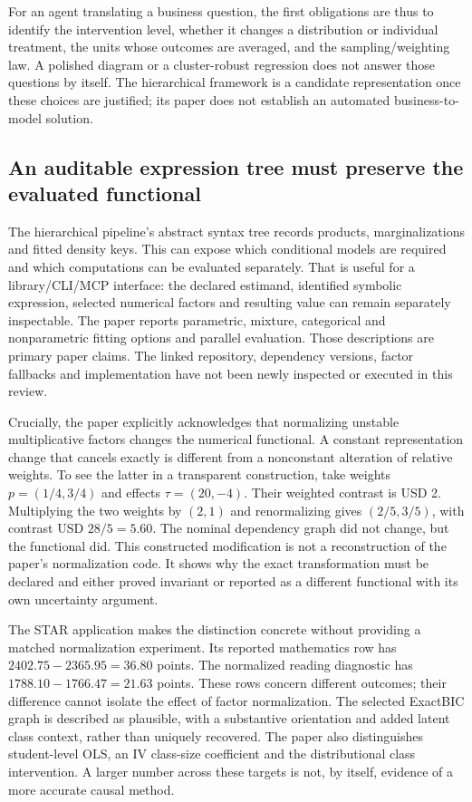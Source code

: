 For an agent translating a business question, the first obligations are thus
to identify the intervention level, whether it changes a distribution or
individual treatment, the units whose outcomes are averaged, and the
sampling/weighting law. A polished diagram or a cluster-robust regression
does not answer those questions by itself. The hierarchical framework is
a candidate representation once these choices are justified; its paper
does not establish an automated business-to-model solution.

\subsection{An auditable expression tree must preserve the evaluated functional}
\label{exec23:structured-ast}

The hierarchical pipeline's abstract syntax tree records products,
marginalizations and fitted density keys. This can expose which conditional
models are required and which computations can be evaluated separately.
That is useful for a library/CLI/MCP interface: the declared estimand,
identified symbolic expression, selected numerical factors and resulting
value can remain separately inspectable. The paper reports parametric,
mixture, categorical and nonparametric fitting options and parallel
evaluation. Those descriptions are primary paper claims. The linked
repository, dependency versions, factor fallbacks and implementation have
not been newly inspected or executed in this review.
\citep{exec23_hierarchical_pipeline}

Crucially, the paper explicitly acknowledges that normalizing unstable
multiplicative factors changes the numerical functional. A constant
representation change that cancels exactly is different from a
nonconstant alteration of relative weights. To see the latter in a
transparent construction, take weights $p=(1/4,3/4)$ and effects
$\tau=(20,-4)$. Their weighted contrast is USD 2. Multiplying the two
weights by $(2,1)$ and renormalizing gives $(2/5,3/5)$, with contrast
USD $28/5=5.60$. The nominal dependency graph did not change, but the
functional did. This constructed modification is not a reconstruction of
the paper's normalization code. It shows why the exact transformation must
be declared and either proved invariant or reported as a different
functional with its own uncertainty argument.
\citep{exec23_hierarchical_pipeline,exec23_structured_reference}

The STAR application makes the distinction concrete without providing a
matched normalization experiment. Its reported mathematics row has
$2402.75-2365.95=36.80$ points. The normalized reading diagnostic has
$1788.10-1766.47=21.63$ points. These rows concern different outcomes;
their difference cannot isolate the effect of factor normalization. The
selected ExactBIC graph is described as plausible, with a substantive
orientation and added latent class context, rather than uniquely recovered.
The paper also distinguishes student-level OLS, an IV class-size coefficient
and the distributional class intervention. A larger number across these
targets is not, by itself, evidence of a more accurate causal method.
\citep{exec23_hierarchical_pipeline,exec23_structured_reference}

